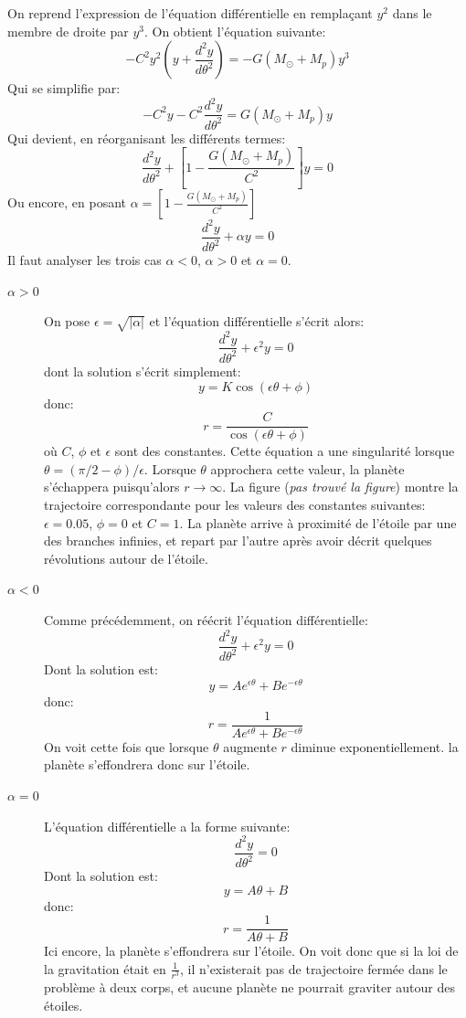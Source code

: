 \documentclass[a4paper,10pt]{report}
\begin{document}
\begin{Answer}
  On reprend l'expression de l'équation différentielle en remplaçant
  $y^2$ dans le membre de droite par $y^3$. On obtient l'équation
  suivante:
  $$
  -C^2 y^2 \left( y + \frac{d^2y}{d \theta ^2} \right) = -G(M_{\odot}
  + M_p)y^3
  $$
  Qui se simplifie par:
  $$
  -C^2 y - C^2 \frac{d^2y}{d \theta ^2} = G(M_{\odot} + M_p)y
  $$
  Qui devient, en réorganisant les différents termes:
  $$
  \frac{d^2y}{d \theta ^2} + \left[ 1 - \frac{ G(M_{\odot} + M_p)
    }{C^2} \right]y = 0
  $$
  Ou encore, en posant $\alpha = \left[ 1 - \frac{ G(M_{\odot} + M_p)
    }{C^2} \right]$
  $$
  \frac{d^2y}{d \theta ^2} + \alpha y = 0
  $$
  Il faut analyser les trois cas $\alpha < 0$, $\alpha > 0$ et $\alpha
  = 0$.
  \begin{description}
  \item[$\alpha > 0$] On pose $\epsilon = \sqrt{\left | \alpha \right |
    }$ et l'équation différentielle s'écrit alors:
    $$
    \frac{d^2y}{d \theta ^2} + \epsilon^2 y = 0
    $$
    dont la solution s'écrit simplement:
    $$
    y = K\cos(\epsilon \theta + \phi)
    $$
    donc:
    $$
    r = \frac{C}{\cos(\epsilon \theta + \phi)}
    $$
    où $C$, $\phi$ et $\epsilon$ sont des constantes. Cette équation a
    une singularité lorsque $\theta = (\pi/2 - \phi) /
    \epsilon$. Lorsque $\theta$ approchera cette valeur, la planète
    s'échappera puisqu'alors $r \to \infty$. La figure (\emph{pas
      trouvé la figure}) montre la trajectoire correspondante pour les
    valeurs des constantes suivantes: $\epsilon = 0.05$, $\phi=0$ et
    $C=1$. La planète arrive à proximité de l'étoile par une des
    branches infinies, et repart par l'autre après avoir décrit
    quelques révolutions autour de l'étoile.

  \item[$\alpha < 0$] Comme précédemment, on réécrit l'équation
    différentielle:
    $$
    \frac{d^2y}{d \theta ^2} + \epsilon^2 y = 0
    $$
    Dont la solution est:
    $$
    y = A e^{\epsilon \theta} + B e^{- \epsilon \theta}
    $$
    donc:
    $$
    r = \frac{1}{A e^{\epsilon \theta} + B e^{- \epsilon \theta}}
    $$
    On voit cette fois que lorsque $\theta$ augmente $r$ diminue
    exponentiellement. la planète s'effondrera donc sur l'étoile.

  \item[$\alpha = 0$] L'équation différentielle a la forme suivante:
    $$
    \frac{d^2y}{d \theta ^2} = 0
    $$
    Dont la solution est:
    $$
    y = A \theta + B
    $$
    donc:
    $$
    r = \frac{1}{A \theta + B}
    $$
    Ici encore, la planète s'effondrera sur l'étoile. On voit donc que
    si la loi de la gravitation était en $\frac{1}{r^3}$, il
    n'existerait pas de trajectoire fermée dans le problème à deux
    corps, et aucune planète ne pourrait graviter autour des étoiles.
  \end{description}
\end{Answer}
\end{document}
